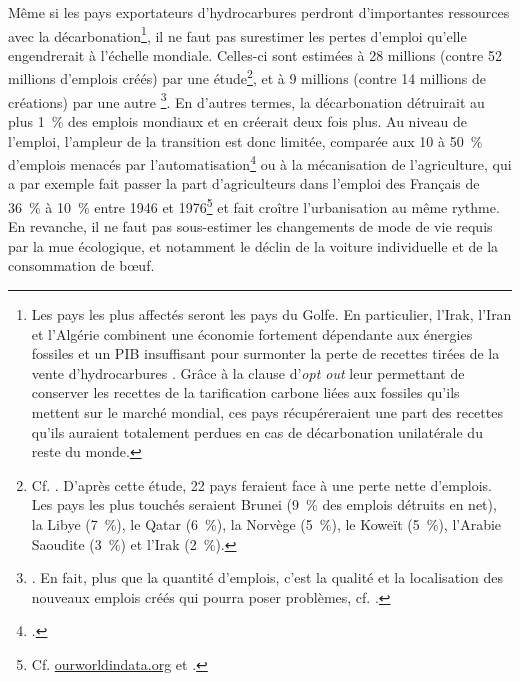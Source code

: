 \documentclass[a5paper,french,openany]{memoir}
\begin{document}
Même si les pays exportateurs d'hydrocarbures perdront d'importantes ressources avec la décarbonation\footnote{Les pays les plus affectés seront les pays du Golfe. En particulier, l'Irak, l'Iran et l'Algérie combinent une économie fortement dépendante aux énergies fossiles et un PIB insuffisant pour surmonter la perte de recettes tirées de la vente d'hydrocarbures \citep{muttitt_equity_2020}. 
Grâce à la clause d'\textit{opt out} leur permettant de conserver les recettes de la tarification carbone liées aux fossiles qu'ils mettent sur le marché mondial, %
ces pays récupéreraient une part des recettes qu'ils auraient totalement perdues en cas de décarbonation unilatérale du reste du monde.
}, il ne faut pas surestimer les pertes d'emploi qu'elle engendrerait à l'échelle mondiale. Celles-ci sont estimées à 28 millions (contre 52 millions d'emplois créés) par une étude\footnote{Cf. \cite{jacobson_100_2017}. D'après cette étude, 22 pays feraient face à une perte nette d'emplois. Les pays les plus touchés seraient Brunei (9~\% des emplois détruits en net), la Libye (7~\%), le Qatar (6~\%), la Norvège (5~\%), le Koweït (5~\%), l'Arabie Saoudite (3~\%) et l'Irak (2~\%).}, et à 9 millions (contre 14 millions de créations) par une autre
\footnote{\cite{pai_meeting_2021}. En fait, plus que la quantité d'emplois, c'est la qualité et la localisation des nouveaux emplois créés qui pourra poser problèmes, cf. \cite{haywood_welfare_2021}.}. En d'autres termes, la décarbonation détruirait au plus 1~\% des emplois mondiaux et en créerait deux fois plus. Au niveau de l'emploi, l'ampleur de la transition est donc limitée, comparée aux 10 à 50~\% d'emplois menacés par l'automatisation\footnote{\cite{frey_future_2017,lassebie_what_2022,hatzius_global_2023}.} ou à la mécanisation de l'agriculture, qui a par exemple fait passer la part d'agriculteurs dans l'emploi des Français de 36~\% à 10~\% entre 1946 et 1976\footnote{Cf. \href{https://ourworldindata.org/grapher/urbanization-last-500-years?country=~FRA}{ourworldindata.org} et \href{https://ourworldindata.org/grapher/share-of-the-labor-force-employed-in-agriculture?tab=chart&time=1800..latest&country=FRA}{\cite{herrendorf_chapter_2014}}.} et fait croître l'urbanisation au même rythme. En revanche, il ne faut pas sous-estimer les changements de mode de vie requis par la mue écologique, et notamment le déclin de la voiture individuelle et de la consommation de bœuf.
\end{document}
